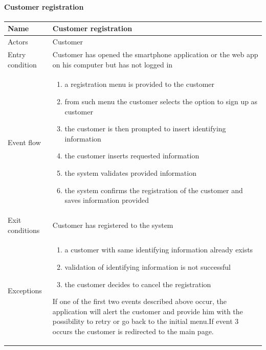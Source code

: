 \paragraph{Customer registration}
\begin{flushleft}
	\begin{tabular} { | m{3cm} | m{10cm} | }
		\hline
		Name & Customer registration\\
		\hline
		Actors & Customer\\
		\hline
		Entry condition & Customer has opened the smartphone application or the web app on his computer but has not logged in\\
		\hline
		Event flow & \begin{enumerate}
			\item a registration menu is provided to the customer
			\item from such menu the customer selects the option to sign up as customer
			\item the customer is then prompted to insert identifying information
			\item the customer inserts requested information
			\item the system validates provided information
			\item the system confirms the registration of the customer and saves information provided
		\end{enumerate}\\
		\hline
		Exit conditions & Customer has registered to the system\\
		\hline
		Exceptions & \begin{enumerate}
			\item a customer with same identifying information already exists
			\item validation of identifying information is not successful
			\item the customer decides to cancel the registration
		\end{enumerate}
		If one of the first two events described above occur, the application will alert the customer and provide him with the possibility to retry or go back to the initial menu.\newline If event 3 occurs the customer is redirected to the main page.\\
		\hline
	\end{tabular}
\end{flushleft}


